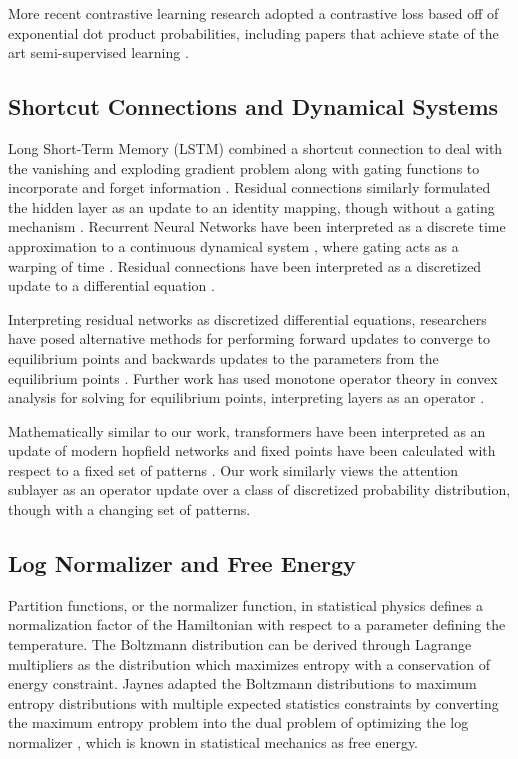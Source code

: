 \documentclass{article}
\begin{document}
More recent contrastive learning research adopted a contrastive loss based off of exponential dot product probabilities, including papers that achieve state of the art semi-supervised learning \cite{wu2018unsupervised,DBLP:journals/corr/abs-2002-05709}.

\subsection{Shortcut Connections and Dynamical Systems}
\label{residual connections}

Long Short-Term Memory (LSTM)  combined a shortcut connection to deal with the vanishing and exploding gradient problem along with gating functions to incorporate and forget information \cite{HochSchm97}. Residual connections similarly formulated the hidden layer as an update to an identity mapping, though without a gating mechanism \cite{he2015deep}. Recurrent Neural Networks have been interpreted as a discrete time approximation to a continuous dynamical system \cite{article}, where gating acts as a warping of time \cite{tallec2018recurrent}. Residual connections have been interpreted as a discretized update to a differential equation \cite{Weinan2017APO,lu2020finite}.

Interpreting residual networks as discretized differential equations, researchers have posed alternative methods for performing forward updates to converge to equilibrium points and backwards updates to the parameters from the equilibrium points \cite{chen2019neural,bai2019deep}. Further work has used monotone operator theory in convex analysis for solving for equilibrium points, interpreting layers as an operator \cite{winston2021monotone}.

Mathematically similar to our work, transformers have been interpreted as an update of modern hopfield networks and fixed points have been calculated with respect to a fixed set of patterns \cite{DBLP:journals/corr/abs-2008-02217}.  Our work similarly views the attention sublayer as an operator update over a class of discretized probability distribution, though with a changing set of patterns.

\subsection{Log Normalizer and Free Energy}
\label{log normalizer}

Partition functions, or the normalizer function, in statistical physics defines a normalization factor of the Hamiltonian with respect to a parameter defining the temperature. The Boltzmann distribution can be derived through Lagrange multipliers as the distribution which maximizes entropy with a conservation of energy constraint. Jaynes adapted the Boltzmann distributions to maximum entropy distributions with multiple expected statistics constraints by converting the maximum entropy problem into the dual problem of optimizing the log normalizer \cite{1456693}, which is known in statistical mechanics as free energy.
\end{document}
